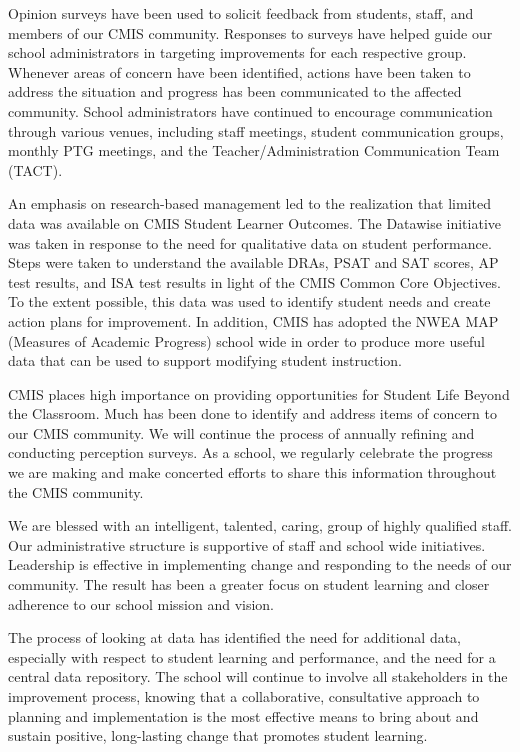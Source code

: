 Opinion surveys have been used to solicit feedback from students, staff, and members of our CMIS community. Responses to surveys have helped guide our school administrators in targeting improvements for each respective group. Whenever areas of concern have been identified, actions have been taken to address the situation and progress has been communicated to the affected community. School administrators have continued to encourage communication through various venues, including staff meetings, student communication groups, monthly PTG meetings, and the Teacher/Administration Communication Team (TACT). 

An emphasis on research-based management led to the realization that limited data was available on CMIS Student Learner Outcomes. The Datawise initiative was taken in response to the need for qualitative data on student performance. Steps were taken to understand the available DRAs, PSAT and SAT scores, AP test results, and ISA test results in light of the CMIS Common Core Objectives. To the extent possible, this data was used to identify student needs and create action plans for improvement. In addition, CMIS has adopted the NWEA MAP (Measures of Academic Progress) school wide in order to produce more useful data that can be used to support modifying student instruction.  

CMIS places high importance on providing opportunities for Student Life Beyond the Classroom. Much has been done to identify and address items of concern to our CMIS community. We will continue the process of annually refining and conducting perception surveys. As a school, we regularly celebrate the progress we are making and make concerted efforts to share this information throughout the CMIS community. 

We are blessed with an intelligent, talented, caring, group of highly qualified staff. Our administrative structure is supportive of staff and school wide initiatives. Leadership is effective in implementing change and responding to the needs of our community. The result has been a greater focus on student learning and closer adherence to our school mission and vision. 

The process of looking at data has identified the need for additional data, especially with respect to student learning and performance, and the need for a central data repository. The school will continue to involve all stakeholders in the improvement process, knowing that a collaborative, consultative approach to planning and implementation is the most effective means to bring about and sustain positive, long-lasting change that promotes student learning. 
